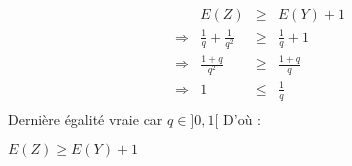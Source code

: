 \[
  \begin{array}{rrcl}
                & E(Z)                      & \geq & E(Y) +1        \\
    \Rightarrow & \frac{1}{q}+\frac{1}{q^2} & \geq & \frac{1}{q} +1 \\
    \Rightarrow & \frac{1+q}{q^2}           & \geq & \frac{1+q}{q}  \\
    \Rightarrow & 1                         & \leq & \frac{1}{q}    \\
  \end{array}
\]
Dernière égalité vraie car $q\in]0, 1[$
D'où :
\begin{result}
  $E(Z) \geq E(Y) + 1$
\end{result}
